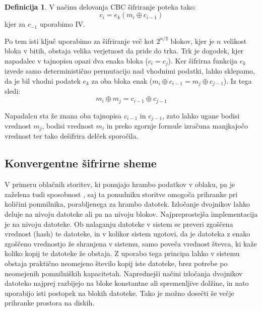 \documentclass[12pt,a4paper,openany,tikz]{book}
\theoremstyle{plain}
\theoremstyle{definition}
\newtheorem{defn}[thm]{Definicija} %
\begin{document}
\

\begin{mdframed}[frametitle={Rojstnodnevni napad na način delovanja CBC}]
\begin{minipage}{\textwidth}
  \begin{defn}
    V načinu delovanja CBC šifriranje poteka tako: $$c_i = e_k(m_i \oplus c_{i-1})$$ kjer za $c_{-1}$ uporabimo \gls{IV}.

    Po tem isti ključ uporabimo za šifriranje več kot $2^{n/2}$ blokov, kjer je $n$ velikost bloka v bitih, obstaja velika verjetnost da pride do trka. Trk je dogodek, kjer napadalec v tajnopisu opazi dva enaka bloka ($c_i = c_j$). Ker šifrirna funkcija $e_k$ izvede samo deterministično permutacijo nad vhodnimi podatki, lahko sklepamo, da je bil vhodni podatek $e_k$ za oba bloka enak ($m_i \oplus c_{i-1} = m_j \oplus c_{j-1}$). Iz tega sledi: $$m_i \oplus m_j = c_{i-1} \oplus c_{j-1}$$

    Napadalcu sta že znana oba tajnopisa $c_{i-1}$ in $c_{j-1}$, zato lahko ugane bodisi vrednost $m_j$, bodisi vrednost $m_i$ in preko zgornje formule izračuna manjkajočo vrednost ter tako dešifrira delček sporočila.
    \label{def:bdayattack}
  \end{defn}
\end{minipage}
\end{mdframed}


\subsection{Konvergentne šifrirne sheme}
\label{sub:Konvergentne šifrirne sheme}

V primeru oblačnih storitev, ki ponujajo hrambo podatkov v oblaku, pa je zaželena tudi sposobnost , saj ta ponudniku storitve omogoča prihranke pri količini pomnilnika, porabljenega za hrambo datotek. Izločanje dvojnikov lahko deluje na nivoju datoteke ali pa na nivoju blokov. Najpreprostejša implementacija je na nivoju datoteke. Ob nalaganju datoteke v sistem se preveri zgoščena vrednost (hash) te datoteke, in v kolikor sistem ugotovi, da je datoteka z enako zgoščeno vrednostjo že shranjena v sistemu, samo poveča vrednost števca, ki kaže koliko kopij te datoteke že obstaja. Z uporabo tega principa lahko v sistemu obstaja praktično neomejeno število kopij iste datoteke, brez potrebe po neomejenih pomnilniških kapacitetah. Naprednejši načini izločanja dvojnikov datoteko najprej razbijejo na bloke konstantne ali spremenljive dolžine, in nato uporabijo isti postopek na blokih datoteke. Tako je možno dosečti še večje prihranke prostora na diskih.
\end{document}
